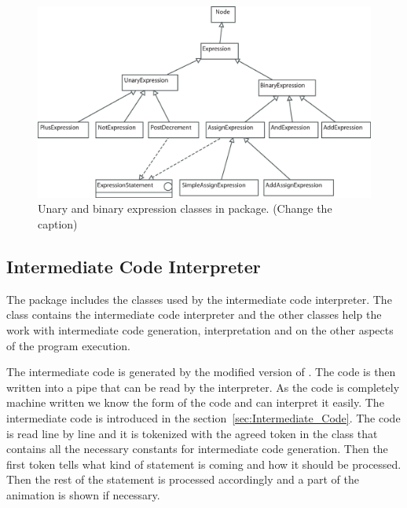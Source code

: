 \begin{figure}[!htb]
\begin{center}
\includegraphics[width=\textwidth]{images/unary-bin-exps.eps}
\caption{Unary and binary expression classes in  package. (Change the caption)}
\label{fig:un_and_bin_exp_classes}
\end{center}
\end{figure}

\subsection{Intermediate Code Interpreter}
\label{sec:Intermediate_Code_Interpreter}

The package  includes the classes used by the intermediate
code interpreter. The class  contains the intermediate code
interpreter and the other classes  help the work with intermediate
code generation, interpretation and on the other aspects of the program execution.

The intermediate code is generated by the modified version of \djava{}. The code is
then written into a pipe that can be read by the interpreter. As the code is completely
machine written we know the form of the code and can interpret it easily. The intermediate
code is introduced in the section~\ref{sec:Intermediate_Code}. The code is read
line by line and it is tokenized with the agreed token in the class  that contains
all the necessary constants for intermediate code generation. Then the first token tells what kind of statement is coming and how it should be processed. Then the rest of the statement is processed accordingly and a part of the animation is shown if necessary.

